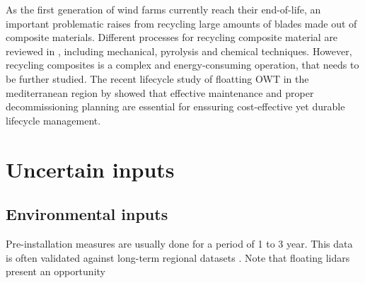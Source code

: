 As the first generation of wind farms currently reach their end-of-life, an important problematic raises from recycling large amounts of blades made out of composite materials. 
Different processes for recycling composite material are reviewed in \citet{jensen_2018_blade_recycling}, including mechanical, pyrolysis and chemical techniques. 
However, recycling composites is a complex and energy-consuming operation, that needs to be further studied. 
The recent lifecycle study of floatting OWT in the mediterranean region by \citet {pulselli_2022_FOWT_lifecycle} showed that effective maintenance and 
proper decommissioning planning are essential for enssuring cost-effective yet durable lifecycle management.  




\section{Uncertain inputs} \label{sec:owt_uncertainties}


\subsection{Environmental inputs}


Pre-installation measures are usually done for a period of 1 to 3 year. 
This data is often validated against long-term regional datasets \cite{sempreviva_2008_wind_assessment_review}. 
Note that floating lidars present an opportunity 



